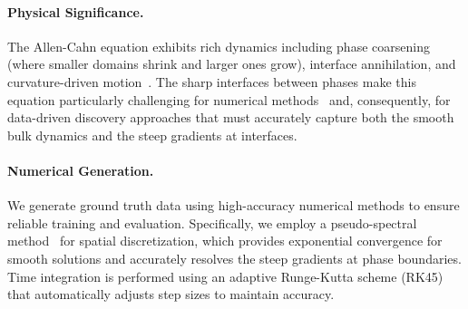 \paragraph{Physical Significance.}
The Allen-Cahn equation exhibits rich dynamics including phase coarsening (where smaller domains shrink and larger ones grow), interface annihilation, and curvature-driven motion~\cite{bates1997spectral}. The sharp interfaces between phases make this equation particularly challenging for numerical methods~\cite{du2019maximum} and, consequently, for data-driven discovery approaches that must accurately capture both the smooth bulk dynamics and the steep gradients at interfaces.

\paragraph{Numerical Generation.}
We generate ground truth data using high-accuracy numerical methods to ensure reliable training and evaluation. Specifically, we employ a pseudo-spectral method~\cite{trefethen2000spectral,boyd2001chebyshev} for spatial discretization, which provides exponential convergence for smooth solutions and accurately resolves the steep gradients at phase boundaries. Time integration is performed using an adaptive Runge-Kutta scheme (RK45)~\cite{dormand1980family} that automatically adjusts step sizes to maintain accuracy.

